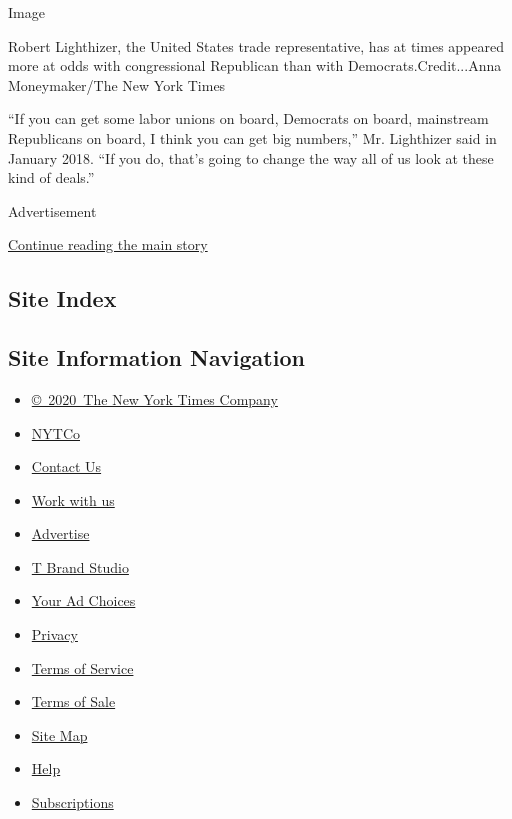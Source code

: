 Image

Robert Lighthizer, the United States trade representative, has at times
appeared more at odds with congressional Republican than with
Democrats.Credit...Anna Moneymaker/The New York Times

``If you can get some labor unions on board, Democrats on board,
mainstream Republicans on board, I think you can get big numbers,'' Mr.
Lighthizer said in January 2018. ``If you do, that's going to change the
way all of us look at these kind of deals.''

Advertisement

\protect\hyperlink{after-bottom}{Continue reading the main story}

\hypertarget{site-index}{%
\subsection{Site Index}\label{site-index}}

\hypertarget{site-information-navigation}{%
\subsection{Site Information
Navigation}\label{site-information-navigation}}

\begin{itemize}
\tightlist
\item
  \href{https://help.nytimes.com/hc/en-us/articles/115014792127-Copyright-notice}{©~2020~The
  New York Times Company}
\end{itemize}

\begin{itemize}
\tightlist
\item
  \href{https://www.nytco.com/}{NYTCo}
\item
  \href{https://help.nytimes.com/hc/en-us/articles/115015385887-Contact-Us}{Contact
  Us}
\item
  \href{https://www.nytco.com/careers/}{Work with us}
\item
  \href{https://nytmediakit.com/}{Advertise}
\item
  \href{http://www.tbrandstudio.com/}{T Brand Studio}
\item
  \href{https://www.nytimes.com/privacy/cookie-policy\#how-do-i-manage-trackers}{Your
  Ad Choices}
\item
  \href{https://www.nytimes.com/privacy}{Privacy}
\item
  \href{https://help.nytimes.com/hc/en-us/articles/115014893428-Terms-of-service}{Terms
  of Service}
\item
  \href{https://help.nytimes.com/hc/en-us/articles/115014893968-Terms-of-sale}{Terms
  of Sale}
\item
  \href{https://spiderbites.nytimes.com}{Site Map}
\item
  \href{https://help.nytimes.com/hc/en-us}{Help}
\item
  \href{https://www.nytimes.com/subscription?campaignId=37WXW}{Subscriptions}
\end{itemize}
